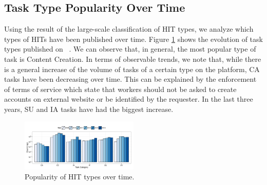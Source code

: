 \subsection{Task Type Popularity Over Time}
Using the result of the large-scale classification of HIT types, we  analyze which  types of HITs have been published over time.
Figure \ref{fig:cat_trends} shows the evolution of task types published on \amt{}\ .
% 
We can observe that, in general, the most popular type of task is Content Creation.
% 
In terms of observable trends, we note that, while there is a general increase of the volume of tasks of a certain type on the platform,  CA tasks have been decreasing over time. This can be explained  by the enforcement of \amt{} terms of service which state that workers should not be asked to create accounts on external website or be identified by the requester.
% 
In the last three years, SU and IA tasks have had the biggest increase.

\begin{figure}[htbp]
	\centering
		\includegraphics[width=0.5\textwidth]{figures/category_trends}
	\caption{Popularity of HIT types over time.}
	\label{fig:cat_trends}
\end{figure}

